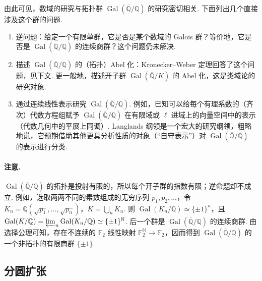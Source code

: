 由此可见，数域的研究与拓扑群 $\operatorname{Gal}(\overline{\mathbb{Q}}/\mathbb{Q})$ 的研究密切相关. 下面列出几个直接涉及这个群的问题.

\begin{enumerate}[label=\roman*)]

\item 逆问题：给定一个有限单群，它是否是某个数域的 Galois 群？等价地，它是否是 $\operatorname{Gal}(\overline{\mathbb{Q}}/\mathbb{Q})$ 的连续商群？这个问题仍未解决.

\item 描述 $\operatorname{Gal}(\overline{\mathbb{Q}}/\mathbb{Q})$ 的（拓扑）Abel 化：Kronecker--Weber 定理回答了这个问题，见下文. 更一般地，描述开子群 $\operatorname{Gal}(\overline{\mathbb{Q}}/K)$ 的 Abel 化，这是类域论的研究对象.

\item 通过连续线性表示研究 $\operatorname{Gal}(\overline{\mathbb{Q}}/\mathbb{Q})$. 例如，已知可以给每个有理系数的（齐次）代数方程组赋予 $\operatorname{Gal}(\overline{\mathbb{Q}}/\mathbb{Q})$ 在有限域或 $\ell$ 进域上的向量空间中的表示（代数几何中的平展上同调）. Langlands 纲领是一个宏大的研究纲领，粗略地说，它预期借助其他更具分析性质的对象（``自守表示''）对 $\operatorname{Gal}(\overline{\mathbb{Q}}/\mathbb{Q})$ 的表示进行分类.

\end{enumerate}

\paragraph{注意.} $\operatorname{Gal}(\overline{\mathbb{Q}}/\mathbb{Q})$ 的拓扑是投射有限的，所以每个开子群的指数有限；逆命题却不成立. 例如，选取两两不同的素数组成的无穷序列 $p_1,p_2,\ldots$，令 $K_n=\mathbb{Q}(\sqrt{p_1},\ldots,\sqrt{p_n})$，$K=\bigcup_nK_n$. 则 $\operatorname{Gal}(K_n/\mathbb{Q})\simeq\{\pm1\}^n$，且 $\operatorname{Gal}(K/\mathbb{Q})=\varprojlim_n\operatorname{Gal}(K_n/\mathbb{Q})\simeq\{\pm1\}^{\mathbb{N}}$. 后一个群是 $\operatorname{Gal}(\overline{\mathbb{Q}}/\mathbb{Q})$ 的连续商群. 由选择公理可知，存在不连续的 $\mathbb{F}_2$ 线性映射 $\mathbb{F}_2^{\mathbb{N}}\longrightarrow\mathbb{F}_2$，因而得到 $\operatorname{Gal}(\overline{\mathbb{Q}}/\mathbb{Q})$ 的一个非拓扑的有限商群 $\{\pm1\}$.

\subsection{分圆扩张}\label{sec:nt-1-1-3}

